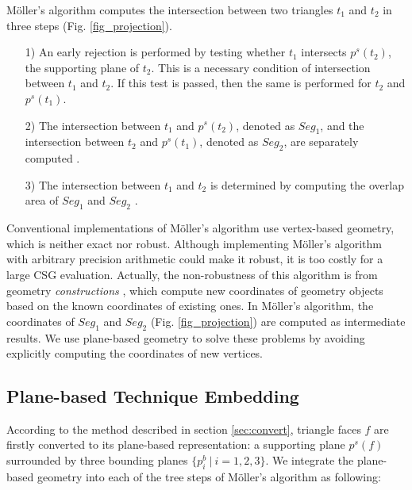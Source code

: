 \documentclass[10pt,journal,compsoc]{IEEEtran}
\begin{document}
M\"{o}ller's algorithm computes the intersection between two triangles $t_1$ and $t_2$ in three steps (Fig. \ref{fig_projection}).
\begin{itemize}[leftmargin=0.45cm]
\item[1)] An early rejection is performed by testing whether $t_1$ intersects $p^s(t_2)$, the supporting plane of $t_2$. This is a necessary condition of intersection between $t_1$ and $t_2$. If this test is passed, then the same is performed for $t_2$ and $p^s(t_1)$.
\item[2)]The intersection between $t_1$ and $p^s(t_2)$, denoted as $Seg_1$, and the intersection between $t_2$ and $p^s(t_1)$, denoted as $Seg_2$, are separately computed .
 \item[3)]The intersection between $t_1$ and $t_2$ is determined by computing the overlap area of $Seg_1$ and $Seg_2$ .
\end{itemize}

Conventional implementations of M\"{o}ller's algorithm use vertex-based geometry, which is neither exact nor robust.  Although implementing M\"{o}ller's algorithm with arbitrary precision arithmetic could make it robust, it is too costly for a large CSG evaluation. Actually, the non-robustness of this algorithm is from geometry \emph{constructions} \cite{bernstein2009fast}, which compute new coordinates of geometry objects based on the known coordinates of existing ones. In M\"{o}ller's algorithm, the coordinates of $Seg_1$ and $Seg_2$ (Fig. \ref{fig_projection}) are computed as intermediate results. We use plane-based geometry to solve these problems by avoiding explicitly computing the coordinates of new vertices.


\subsection{Plane-based Technique Embedding}

\label{sec:embed}
According to the method described in section \ref{sec:convert}, triangle faces $f$ are firstly converted to its plane-based representation: a supporting plane $p^s(f)$ surrounded by three bounding planes $\{p^b_i\ |\  i = 1,2,3\}$. We integrate the plane-based geometry into each of the tree steps of M\"{o}ller's algorithm as following:
\end{document}
